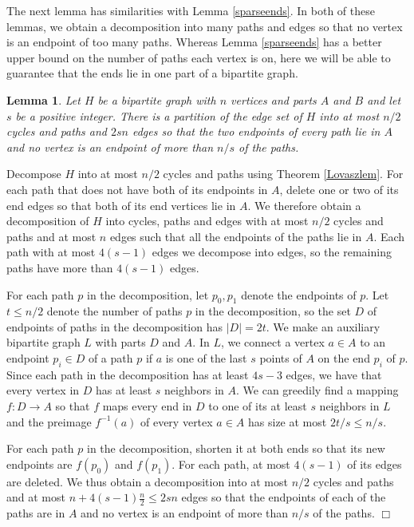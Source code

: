 \documentclass[11pt]{article}
\newtheorem{lemma}[theorem]{Lemma}
\newenvironment{proof}
      {\medskip\noindent{\bf Proof:}\hspace{1mm}}
      {\hfill$\Box$\medskip}
\begin{document}
The next lemma has similarities with Lemma \ref{sparseends}. In both of these lemmas, we obtain a decomposition into many paths and edges so that no vertex is an endpoint of too many paths. Whereas Lemma \ref{sparseends} has a better upper bound on the number of paths each vertex is on, here we will be able to guarantee that the ends lie in one part of a bipartite graph.

\begin{lemma}\label{bipdecomp}
Let $H$ be a bipartite graph with $n$ vertices and parts $A$ and $B$ and let $s$ be a positive integer. There is a partition of the edge set of $H$ into at most $n/2$ cycles and paths and $2sn$ edges so that the two endpoints of every path lie in $A$ and no vertex is an endpoint of more than $n/s$ of the  paths.
\end{lemma}

\begin{proof}
Decompose $H$ into at most $n/2$ cycles and paths using Theorem \ref{Lovaszlem}.  For each path that does not have both of its endpoints in $A$, delete one or two of its end edges so that both of its end vertices lie in $A$. We therefore obtain a decomposition of $H$ into cycles, paths and edges with at most $n/2$ cycles and paths and at most $n$ edges such that all the endpoints of the paths lie in $A$. Each path with at most $4(s-1)$ edges we decompose into edges, so the remaining paths have more than $4(s-1)$ edges.

For each path $p$ in the decomposition, let $p_0,p_1$ denote the endpoints of $p$. Let $t \leq n/2$ denote the number of paths $p$ in the decomposition, so the set $D$ of endpoints of paths in the decomposition has $|D|=2t$. We make an auxiliary bipartite graph $L$ with parts $D$ and $A$. In $L$, we connect a vertex $a \in A$ to an endpoint $p_i \in D$ of a path $p$ if $a$ is one of the last $s$ points of $A$ on the end $p_i$ of $p$. Since each path in the decomposition has at least $4s-3$ edges, we have that every vertex in $D$ has at least $s$ neighbors in $A$. We can greedily find a mapping $f:D \rightarrow A$ so that $f$ maps every end in $D$ to one of its at least $s$ neighbors in $L$ and the preimage $f^{-1}(a)$ of every vertex $a \in A$ has size at most $2t/s \leq n/s$.

For each path $p$ in the decomposition, shorten it at both ends so that its new endpoints are $f(p_0)$ and $f(p_1)$. For each path, at most $4(s-1)$ of its edges are deleted. We thus obtain a decomposition into at most $n/2$ cycles and paths and at most $n+4(s-1)\frac{n}{2} \leq 2sn$ edges so that the endpoints of each of the paths are in $A$ and no vertex is an endpoint of more than $n/s$ of the paths.
\end{proof}
\end{document}
